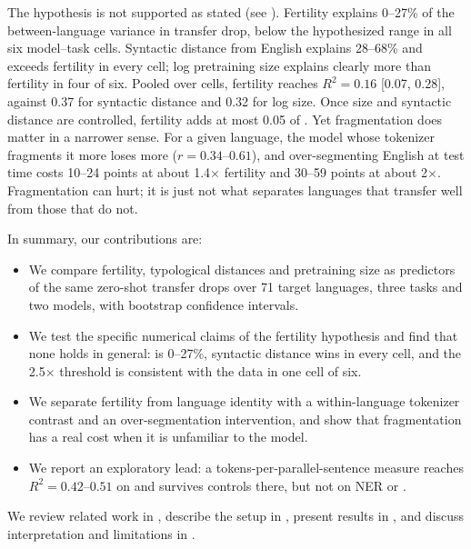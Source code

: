 The hypothesis is not supported as stated (see ).
Fertility explains 0--27\% of the between-language variance in transfer drop, below the hypothesized range in all six model--task cells.
Syntactic distance from English explains 28--68\% and exceeds fertility in every cell; log pretraining size explains clearly more than fertility in four of six.
Pooled over cells, fertility reaches $R^2=0.16$ [0.07, 0.28], against 0.37 for syntactic distance and 0.32 for log size.
Once size and syntactic distance are controlled, fertility adds at most 0.05 of \rsq.
Yet fragmentation does matter in a narrower sense.
For a given language, the model whose tokenizer fragments it more loses more ($r=0.34$--$0.61$), and over-segmenting English at test time costs 10--24 points at about 1.4$\times$ fertility and 30--59 points at about 2$\times$.
Fragmentation can hurt; it is just not what separates languages that transfer well from those that do not.

In summary, our contributions are:
\begin{itemize}[leftmargin=*,itemsep=0pt,topsep=0pt]
    \item We compare fertility, \uriel typological distances and pretraining size as predictors of the same zero-shot transfer drops over 71 target languages, three tasks and two models, with bootstrap confidence intervals.
    \item We test the specific numerical claims of the fertility hypothesis and find that none holds in general: \rsq is 0--27\%, syntactic distance wins in every cell, and the 2.5$\times$ threshold is consistent with the data in one cell of six.
    \item We separate fertility from language identity with a within-language tokenizer contrast and an over-segmentation intervention, and show that fragmentation has a real cost when it is unfamiliar to the model.
    \item We report an exploratory lead: a tokens-per-parallel-sentence measure reaches $R^2=0.42$--$0.51$ on \sib and survives controls there, but not on NER or \xnli.
\end{itemize}

We review related work in , describe the setup in , present results in , and discuss interpretation and limitations in .
